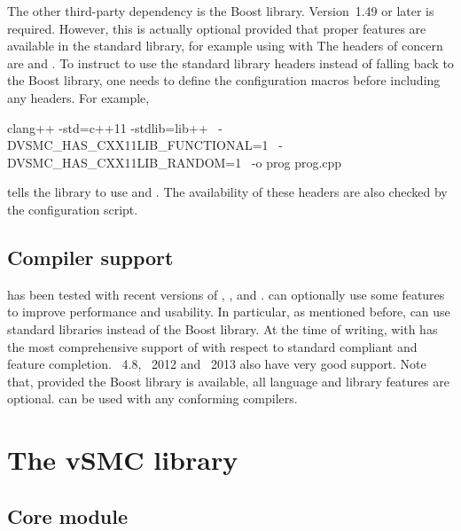 The other third-party dependency is the Boost library. Version~1.49 or later
is required. However, this is actually optional provided that proper \cppoo
features are available in the standard library, for example using \clang with
\libcpp The \cppoo headers of concern are  and
. To instruct \vsmc to use the standard library headers instead
of falling back to the Boost library, one needs to define the configuration
macros before including any \vsmc headers. For example,
\begin{cppcode}
clang++ -std=c++11 -stdlib=lib++     \
    -DVSMC_HAS_CXX11LIB_FUNCTIONAL=1  \
    -DVSMC_HAS_CXX11LIB_RANDOM=1      \
    -o prog prog.cpp
\end{cppcode}
tells the library to use \cppoo{}  and .
The availability of these headers are also checked by the \cmake configuration
script.

\subsection{Compiler support}

\vsmc has been tested with recent versions of \clang, \gcc, \icpc and \msvc.
\vsmc can optionally use some \cppoo features to improve performance and
usability. In particular, as mentioned before, \vsmc can use \cppoo standard
libraries instead of the Boost library. At the time of writing, \clang with
\libcpp has the most comprehensive support of \cppoo with respect to standard
compliant and feature completion. \gcc~4.8, \msvc~2012 and \icpc~2013 also
have very good \cppoo support. Note that, provided the Boost library is
available, all \cppoo language and library features are optional. \vsmc can be
used with any \cppne conforming compilers.

\section{The vSMC library}
\label{sec:The vSMC library}

\subsection{Core module}
\label{sub:Core module}


